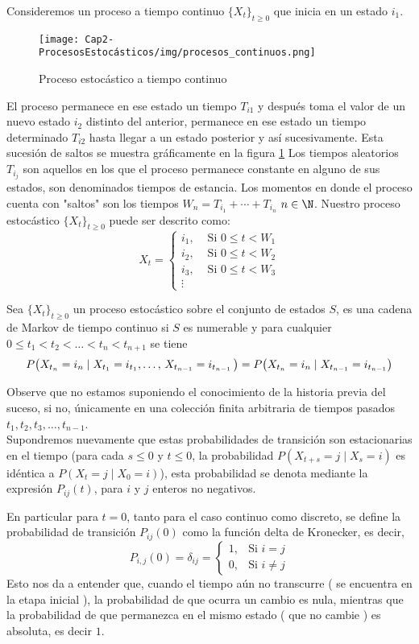 Consideremos un proceso a tiempo continuo $\{X_t\}_{t\geq 0}$ que inicia en un estado $i_1$.
\begin{figure}
    \centering
    \texttt{[image: Cap2-ProcesosEstocásticos/img/procesos\_continuos.png]}
    \caption{Proceso estocástico a tiempo continuo}
    \label{fig-procEstocastContinuo}
\end{figure}
El proceso permanece en ese estado un tiempo $T_{i 1}$ y
después toma el valor de un nuevo estado $i_2$ distinto del anterior, permanece en ese estado un tiempo determinado $T_{i 2}$ hasta llegar a un estado posterior y así sucesivamente. Esta
sucesión de saltos se muestra gráficamente en la figura \ref{fig-procEstocastContinuo}
Los tiempos aleatorios $T_{i_j}$ son aquellos
en los que el proceso permanece constante en alguno de sus estados, son denominados tiempos de estancia.
Los momentos en donde el proceso cuenta con "saltos" son los tiempos $W_n=T_{i_1}+\cdots+T_{i_n}$ $n\in\N$.
Nuestro proceso estocástico $\{X_t\}_{t\geq 0}$ puede ser descrito como:
 $$X_t =
 \begin{cases}
    i_1, & \mbox{ Si $0\leq t <W_1$}\\
    i_2, & \mbox{ Si $0\leq t <W_2$}\\
    i_3, & \mbox{ Si $0\leq t <W_3$}\\
    \vdots
 \end{cases}$$
\begin{Def}
    Sea $\{X_t\}_{t\geq 0}$ un proceso estocástico sobre el conjunto de estados $S$, es una cadena de Markov de tiempo continuo si $S$ es numerable y para cualquier $0\leq t_1<t_2<\ldots<t_n<t_{n+1}$ se tiene  $$P\big(X_{t_n}=i_n\mid X_{t_1}=i_{t_1},\ldots ,\thinspace X_{t_{n-1}}=i_{t_{n-1}}\thinspace \big)=P\big(X_{t_n}=i_n\mid X_{t_{n-1}}=i_{t_{n-1}}\big)$$
\end{Def}
Observe que no estamos suponiendo el conocimiento de la historia previa del suceso, si no, únicamente en una colección finita arbitraria de tiempos pasados $t_1,t_2,t_3,\ldots,t_{n-1}$.\\
Supondremos nuevamente que estas probabilidades de transición son estacionarias en el tiempo (para cada $s\leq 0$ y $t\leq 0$, la probabilidad $P(X_{t+s} =j \mid X_s= i)$ 
es idéntica a $P(X _{t} =j \mid X_0= i)$), esta probabilidad se denota mediante la expresión $P_{i j}(t)$, para $i$ y $j$ enteros no negativos.\\
\begin{Obs}
    En particular para $t= 0$, tanto para el caso continuo como discreto, se define la probabilidad de transición $P_{i j}(0)$ como la función delta de Kronecker, es decir,
    $$P_{i,j}(0)=\delta_{i j}=\begin{cases}
        1, & \mbox{Si $i=j$}\\
        0, & \mbox{Si $i\not= j$}
    \end{cases}$$
    Esto nos da a entender que, cuando el tiempo aún no transcurre ( se encuentra en la etapa inicial ), la probabilidad de que ocurra un cambio es nula, mientras que la probabilidad de que permanezca en el mismo estado ( que no cambie ) es absoluta, es decir $1$.
\end{Obs}
